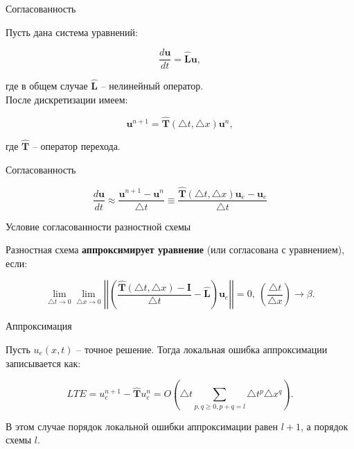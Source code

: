 \documentclass[12pt,xcolor=pst,aspectratio=169]{beamer}
\begin{document}
\begin{frame}{Согласованность}

	\transdissolve[duration=0.1]
	\justifying
	\large

	Пусть дана система уравнений:

	\[
		\frac{d \textbf{u}}{d t} = \hat{\textbf{L}} \textbf{u},
	\]
	
	где в общем случае $\hat{\textbf{L}}$ -- нелинейный оператор.\\

	После дискретизации имеем:

	\[
		\textbf{u}^{n+1} = \hat{\textbf{T}} (\triangle t, \triangle x) \textbf{u}^{n},
	\]

	где $\hat{\textbf{T}}$ -- оператор перехода.

\end{frame}

\begin{frame}{Согласованность}

	\transdissolve[duration=0.1]
	\justifying
	\large

	\[
		\frac{d \textbf{u}}{d t} \approx \frac{\textbf{u}^{n + 1} - \textbf{u}^{n}}{\triangle t} \equiv \frac{\hat{\textbf{T}} (\triangle t, \triangle x) \textbf{u}_{e} - \textbf{u}_{e}}{\triangle t}
	\]

	\begin{block}{Условие согласованности разностной схемы}

		Разностная схема \textbf{аппроксимирует уравнение} (или согласована с уравнением), если:

		\[
			\lim_{\triangle t \rightarrow 0} \lim_{\triangle x \rightarrow 0} \left| \left| \left( \frac{\hat{\textbf{T}} (\triangle t, \triangle x) - \textbf{I}}{\triangle t} - \hat{\textbf{L}} \right) \textbf{u}_{e} \right| \right| = 0, \: \left( \frac{\triangle t}{\triangle x} \right) \rightarrow \beta.
		\]

	\end{block}

\end{frame}

\begin{frame}{Аппроксимация}

	\transdissolve[duration=0.1]
	\justifying
	\large

	Пусть $u_{e} (x, t)$ -- точное решение. Тогда локальная ошибка аппроксимации записывается как:

	\[
		LTE = u^{n + 1}_{e} - \hat{\textbf{T}} u^{n}_{e} = O \left( \triangle t \sum_{p , q \geq 0, p + q = l} \triangle t^{p} \triangle x^{q} \right).
	\]

	В этом случае порядок локальной ошибки аппроксимации равен $l + 1$, а порядок схемы $l$.

\end{frame}
\end{document}

